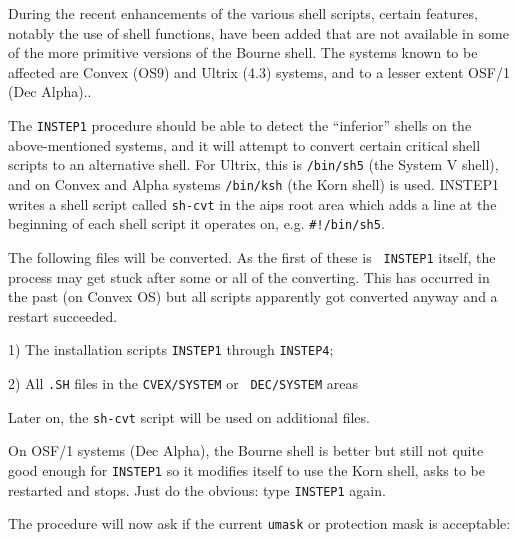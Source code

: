 During the recent enhancements of the various shell scripts, certain
features, notably the use of shell functions, have been added that are
not available in some of the more primitive versions of the Bourne
shell.  The systems known to be affected are Convex (OS9) and Ultrix
(4.3) systems, and to a lesser extent OSF/1 (Dec Alpha)..

The {\tt INSTEP1} procedure should be able to detect the ``inferior''
shells on the above-mentioned systems, and it will attempt to convert
certain critical shell scripts to an alternative shell.  For Ultrix, this
is {\tt /bin/sh5} (the System V shell), and on Convex and Alpha systems
{\tt /bin/ksh} (the Korn shell) is used.  INSTEP1 writes a shell script
called {\tt sh-cvt} in the aips root area which adds a line at the
beginning of each shell script it operates on, e.g. {\tt \#!/bin/sh5}.

The following files will be converted.  As the first of these is {\tt
INSTEP1} itself, the process may get stuck after some or all of the
converting.  This has occurred in the past (on Convex OS) but all scripts
apparently got converted anyway and a restart succeeded.\medskip

\item{1)} The installation scripts {\tt INSTEP1} through {\tt INSTEP4};
\item{2)} All {\tt *.SH} files in the {\tt CVEX/SYSTEM} or {\tt
          DEC/SYSTEM} areas\medskip

\noindent Later on, the {\tt sh-cvt} script will be used on additional
files.

On OSF/1 systems (Dec Alpha), the Bourne shell is better but still not
quite good enough for {\tt INSTEP1} so it modifies itself to use the
Korn shell, asks to be restarted and stops.  Just do the obvious: type
{\tt INSTEP1} again.
\medskip


The procedure will now ask if the current {\tt umask} or protection
mask is acceptable:\medskip

\medskip

